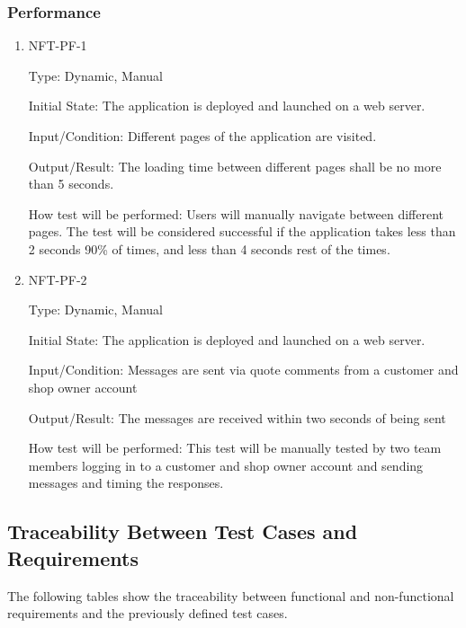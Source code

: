 \documentclass[12pt, titlepage]{article}
\begin{document}
\subsubsection{Performance}
\begin{enumerate}

\item{NFT-PF-1}

Type: Dynamic, Manual
					
Initial State: The application is deployed and launched on a web server.
					
Input/Condition: Different pages of the application are visited.
					
Output/Result: The loading time between different pages shall be no more than 5 seconds.
					
How test will be performed: Users will manually navigate between different pages. The test will be considered successful if the application takes less than 2 seconds 90\% of times, and less than 4 seconds rest of the times.

\item{NFT-PF-2}

Type: Dynamic, Manual
					
Initial State: The application is deployed and launched on a web server.
					
Input/Condition: Messages are sent via quote comments from a customer and shop owner account
					
Output/Result: The messages are received within two seconds of being sent
					
How test will be performed: This test will be manually tested by two team members logging in to a customer and shop owner account and sending messages and timing the responses.
\end{enumerate}


\subsection{Traceability Between Test Cases and Requirements}

  
The following tables show the traceability between functional and non-functional requirements and the previously defined test cases.
\end{document}
